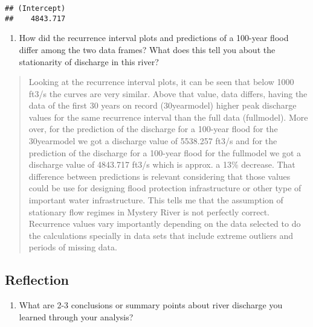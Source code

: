 \documentclass[]{article}
\providecommand{\tightlist}{%
  \setlength{\itemsep}{0pt}\setlength{\parskip}{0pt}}
\begin{document}
\begin{verbatim}
## (Intercept) 
##    4843.717
\end{verbatim}

\begin{enumerate}
\def\labelenumi{\arabic{enumi}.}
\setcounter{enumi}{11}
\tightlist
\item
  How did the recurrence interval plots and predictions of a 100-year
  flood differ among the two data frames? What does this tell you about
  the stationarity of discharge in this river?
\end{enumerate}

\begin{quote}
Looking at the recurrence interval plots, it can be seen that below 1000
ft3/s the curves are very similar. Above that value, data differs,
having the data of the first 30 years on record (30yearmodel) higher
peak discharge values for the same recurrence interval than the full
data (fullmodel). More over, for the prediction of the discharge for a
100-year flood for the 30yearmodel we got a discharge value of 5538.257
ft3/s and for the prediction of the discharge for a 100-year flood for
the fullmodel we got a discharge value of 4843.717 ft3/s which is
approx. a 13\% decrease. That difference between predictions is relevant
considering that those values could be use for designing flood
protection infrastructure or other type of important water
infrastructure. This tells me that the assumption of stationary flow
regimes in Mystery River is not perfectly correct. Recurrence values
vary importantly depending on the data selected to do the calculations
specially in data sets that include extreme outliers and periods of
missing data.
\end{quote}

\hypertarget{reflection}{%
\subsection{Reflection}\label{reflection}}

\begin{enumerate}
\def\labelenumi{\arabic{enumi}.}
\setcounter{enumi}{12}
\tightlist
\item
  What are 2-3 conclusions or summary points about river discharge you
  learned through your analysis?
\end{enumerate}
\end{document}
